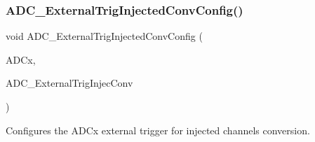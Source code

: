 \subsubsection{\texorpdfstring{ADC\_ExternalTrigInjectedConvConfig()}{ADC\_ExternalTrigInjectedConvConfig()}}
{\footnotesize\ttfamily void A\+D\+C\+\_\+\+External\+Trig\+Injected\+Conv\+Config (\begin{DoxyParamCaption}\item[{\mbox{\hyperlink{struct_a_d_c___type_def}{A\+D\+C\+\_\+\+Type\+Def}} $\ast$}]{A\+D\+Cx,  }\item[{uint32\+\_\+t}]{A\+D\+C\+\_\+\+External\+Trig\+Injec\+Conv }\end{DoxyParamCaption})}



Configures the A\+D\+Cx external trigger for injected channels conversion. 


